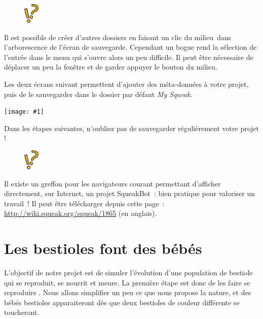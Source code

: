 \documentclass[a4paper,12pt]{book}
\def\appName{SqueakBot}
\def\cm{clic du milieu~}
\newcommand{\capture}[1]
{
\begin{center}
	\texttt{[image: \#1]}
\end{center}
}
\newcommand{\astuce}[1]
{
\begin{framed}
\begin{figure}
	\vspace{-15pt}
	\includegraphics[width=2.0em]{astuce.png}
\end{figure}
#1
\end{framed}
}
\let\myMargin\marginpar
\renewcommand{\marginpar}[1]{\myMargin{{\scriptsize \sffamily #1}}}
\begin{document}
\astuce{Il est possible de créer d'autres dossiers en faisant un \cm dans
l'arborescence de l'écran de sauvegarde. Cependant un bogue rend la sélection
de l'entrée dans le menu qui s'ouvre alors un peu difficile. Il peut être
nécessaire de déplacer un peu la fenêtre et de garder appuyer le bouton du
milieu.} Les deux écrans suivant permettent d'ajouter des méta-données à votre
projet, puis de le sauvegarder dans le dossier par défaut \textit{My Squeak}.

\capture{47.png}

Dans les étapes suivantes, n'oubliez pas de sauvegarder régulièrement votre
projet !

\astuce{Il existe un greffon pour les navigateurs courant permettant d'afficher
directement, sur Internet, un projet \appName~: bien pratique pour valoriser un
travail~! Il peut être télécharger depuis cette page~:
\url{http://wiki.squeak.org/squeak/1865} (en anglais).}

\section{Les bestioles font des bébés}

L'objectif de notre projet est de simuler l'évolution d'une population de
bestiole qui se reproduit, se nourrit et meure. La première étape est donc de
les faire se \og reproduire \fg. Nous allons simplifier un peu ce que nous
propose la nature, et des bébés bestioles apparaiteront dès que deux bestioles
de couleur différente se toucheront.
\end{document}
